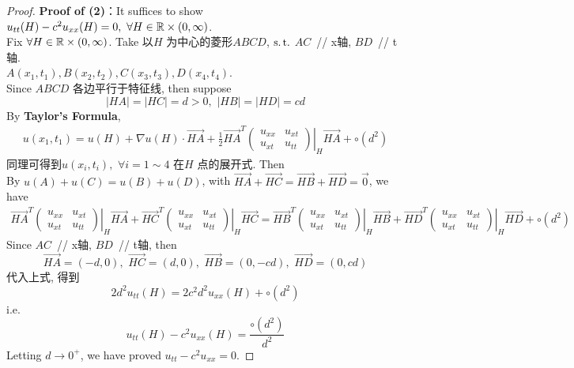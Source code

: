 \begin{thm}
		\begin{proof}
			\textbf{Proof of (2)}：It suffices to show $u_{tt}(H) - c^2 u_{xx}(H) = 0 , \,\, \forall H \in \mathbb{R} \times (0 , \infty)$. \\
			Fix $\forall H \in \mathbb{R} \times (0 , \infty)$. Take 以$H$ 为中心的菱形$ABCD$, $\operatorname{s.t.}$ $AC \,$ // x轴, $BD \,$ // t轴.  \\
			$A(x_1 , t_1) , B(x_2 , t_2) , C(x_3 , t_3) , D(x_4 , t_4)$. \\
			Since $ABCD$ 各边平行于特征线, then suppose 
			\[ \left| HA \right| = \left| HC \right| = d > 0 , \,\, \left| HB \right| = \left| HD \right| = cd \]
			By \textbf{Taylor's Formula}, 
			\begin{align*}
				u(x_1 , t_1) 
				= u(H) + \nabla u(H) \cdot \overrightarrow{HA} + \frac{1}{2} \overrightarrow{HA}^T 
				\left. 
				\begin{pmatrix*}
					u_{xx} &u_{xt} \\
					u_{xt} &u_{tt}
				\end{pmatrix*} 
				\right|_{H} \overrightarrow{HA} + \circ(d^2) 
			\end{align*}
			同理可得到$u(x_i , t_i) , \,\, \forall i = 1 \sim 4$ 在$H$ 点的展开式. Then \\
			By $u(A) + u(C) = u(B) + u(D)$, with $\overrightarrow{HA} + \overrightarrow{HC} = \overrightarrow{HB} + \overrightarrow{HD} = \vec{0}$, we have
			\begin{align*}
				\overrightarrow{HA}^T 
				\left. 
				\begin{pmatrix*}
					u_{xx} &u_{xt} \\
					u_{xt} &u_{tt}
				\end{pmatrix*} 
				\right|_{H} \overrightarrow{HA} + 
				\overrightarrow{HC}^T 
				\left. 
				\begin{pmatrix*}
					u_{xx} &u_{xt} \\
					u_{xt} &u_{tt}
				\end{pmatrix*} 
				\right|_{H} \overrightarrow{HC} 
				= 
				\overrightarrow{HB}^T 
				\left. 
				\begin{pmatrix*}
					u_{xx} &u_{xt} \\
					u_{xt} &u_{tt}
				\end{pmatrix*} 
				\right|_{H} \overrightarrow{HB} + 
				\overrightarrow{HD}^T 
				\left. 
				\begin{pmatrix*}
					u_{xx} &u_{xt} \\
					u_{xt} &u_{tt}
				\end{pmatrix*} 
				\right|_{H} \overrightarrow{HD} + \circ(d^2)
			\end{align*}
			Since $AC \,$ // x轴, $BD \,$ // t轴, then
			\[ \overrightarrow{HA} = (-d , 0) , \,\, \overrightarrow{HC} = (d , 0) , \,\, \overrightarrow{HB} = (0 , -cd) , \,\, \overrightarrow{HD} = (0 , cd) \]
			代入上式, 得到
			\[ 2d^2 u_{tt}(H) = 2c^2 d^2 u_{xx}(H) + \circ(d^2) \]
			i.e. 
			\[ u_{tt}(H) - c^2 u_{xx}(H) = \frac{\circ(d^2)}{d^2} \]
			Letting $d \to 0^+$, we have proved $u_{tt} - c^2 u_{xx} = 0$. 
		\end{proof}
	\end{thm}
	
	


	\ifx\allfiles\undefined

\fi